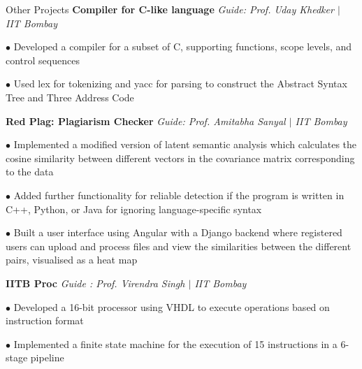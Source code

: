 \begin{rubric}{Other Projects}
    \entry*[2022] \textbf{Compiler for C-like language} \hfill \emph{Guide: Prof. Uday Khedker $\mid$ IIT Bombay}

        $\bullet$ Developed a compiler for a subset of C, supporting functions, scope levels, and control sequences

        $\bullet$ Used lex for tokenizing and yacc for parsing to construct the Abstract Syntax Tree and Three Address Code 

    \entry*[2020] \textbf{Red Plag: Plagiarism Checker} \hfill \emph{Guide: Prof. Amitabha Sanyal $\mid$ IIT Bombay}
	    
	    $\bullet$ Implemented a modified version of latent semantic analysis which calculates the cosine similarity between different vectors in the covariance matrix corresponding to the data
        
        $\bullet$ Added further functionality for reliable detection if the program is written in C++, Python, or Java for ignoring language-specific syntax

        $\bullet$ Built a user interface using Angular with a Django backend where registered users can upload and process files and view the similarities between the different pairs, visualised as a heat map

    \entry*[2021] \textbf{IITB Proc} \hfill \emph{Guide : Prof. Virendra Singh $\mid$ IIT Bombay}
        
        $\bullet$ Developed a 16-bit processor using VHDL to execute operations based on instruction format

        $\bullet$ Implemented a finite state machine for the execution of 15 instructions in a 6-stage pipeline


        
        
\end{rubric}